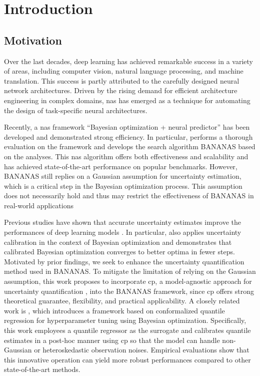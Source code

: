 \documentclass[a4paper,oneside,bibliography=totoc]{scrbook}
\begin{document}
\begingroup%
\hypersetup{hidelinks} %
\tableofcontents%
\endgroup


\mainmatter  %

\chapter{Introduction}
\label{ch:intro}

\section{Motivation}
Over the last decades, deep learning has achieved remarkable success in a variety of areas, including computer vision, natural language processing, and machine translation. This success is partly attributed to the carefully designed neural network architectures. Driven by the rising demand for efficient architecture engineering in complex domains, \gls{nas} has emerged as a technique for automating the design of task-specific neural architectures.

Recently, a \gls{nas} framework “Bayesian optimization + neural predictor” has been developed and demonstrated strong efficiency. In particular, \cite{white2019bananas}  performs a thorough evaluation on the framework and develops the search algorithm BANANAS based on the analyses. This \gls{nas} algorithm offers both effectiveness and scalability and has achieved state-of-the-art performance on popular benchmarks. However, BANANAS still replies on a Gaussian assumption for uncertainty estimation, which is a critical step in the Bayesian optimization process. This assumption does not necessarily hold and thus may restrict the effectiveness of BANANAS in real-world applications

Previous studies have shown that accurate uncertainty estimates improve the performances of deep learning models \cite{pmlr-v80-kuleshov18a}. In particular, \cite{deshpande2024online} also applies uncertainty calibration in the context of Bayesian optimization and demonstrates that calibrated Bayesian optimization converges to better optima in fewer steps. Motivated by prior findings, we seek to enhance the uncertainty quantification method used in BANANAS. To mitigate the limitation of relying on the Gaussian assumption, this work proposes to incorporate \gls{cp},  a model-agnostic approach for uncertainty quantification \cite{shafer2008tutorial, vovk2005algorithmic}, into the BANANAS framework, since \gls{cp} offers strong theoretical guarantee, flexibility, and practical applicability. A closely related work is \cite{salinas2023optimizing}, which introduces a framework based on conformalized quantile regression for hyperparameter tuning using Bayesian optimization. Specifically, this work employees a quantile regressor as the surrogate and calibrates quantile estimates in a post-hoc manner using \gls{cp} so that the model can handle non-Gaussian or heteroskedastic observation noises. Empirical evaluations show that this innovative operation can yield more robust performances compared to other state-of-the-art methods.
\end{document}
